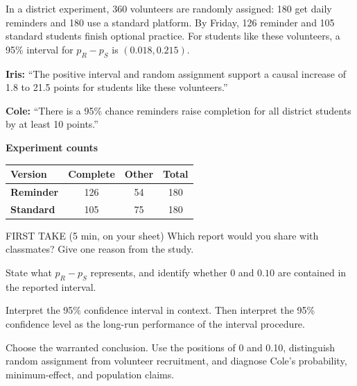 \documentclass[14pt]{extarticle}
\begin{document}
\pagestyle{empty}


\noindent\begin{minipage}[t]{0.57\linewidth}
\vspace{0pt}
In a district experiment, 360 volunteers are randomly assigned: 180 get daily reminders and 180 use a standard platform. By Friday, 126 reminder and 105 standard students finish optional practice. For students like these volunteers, a 95\% interval for $p_R-p_S$ is $(0.018,0.215)$.\par\smallskip \textbf{Iris:} ``The positive interval and random assignment support a causal increase of 1.8 to 21.5 points for students like these volunteers.''\par \textbf{Cole:} ``There is a 95\% chance reminders raise completion for all district students by at least 10 points.''\par
\end{minipage}\hfill
\begin{minipage}[t]{0.40\linewidth}
\vspace{0pt}
\begin{center}
\textbf{Experiment counts}\par\smallskip
\begin{tabular}{|l|c|c|c|}
\hline
\textbf{Version} & \textbf{Complete} & \textbf{Other} & \textbf{Total} \\ \hline
\textbf{Reminder} & 126 & 54 & 180 \\ \hline
\textbf{Standard} & 105 & 75 & 180 \\ \hline
\end{tabular}
\end{center}
\end{minipage}

\begin{firsttakebox}{FIRST TAKE (5 min, on your sheet)}
Which report would you share with classmates? Give one reason from the study.
\end{firsttakebox}

\begin{description}[leftmargin=1.15in, labelwidth=1in, itemsep=2pt, topsep=2pt]
  \item[\dokbadge{1}~(a)] State what $p_R-p_S$ represents, and identify whether $0$ and $0.10$ are contained in the reported interval.
  \item[\dokbadge{2}~(b)] Interpret the 95\% confidence interval in context. Then interpret the 95\% confidence level as the long-run performance of the interval procedure.
  \item[\dokbadge{3}~(c)] Choose the warranted conclusion. Use the positions of 0 and 0.10, distinguish random assignment from volunteer recruitment, and diagnose Cole's probability, minimum-effect, and population claims.
\end{description}
\end{document}
